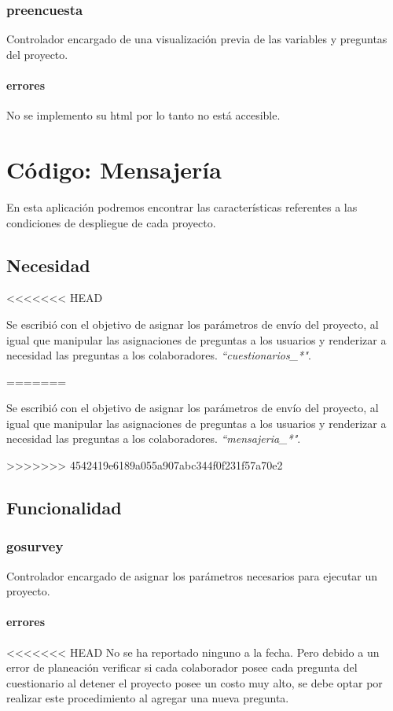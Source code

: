 \documentclass[10pt,a4paper]{book}
\begin{document}
	\subsection{preencuesta}
	Controlador encargado de una visualización previa de las variables y preguntas del proyecto.
	\subsubsection{errores}
	No se implemento su html por lo tanto no está accesible.


	\chapter{Código: Mensajería}

	En esta aplicación podremos encontrar las características referentes a las condiciones de despliegue de cada proyecto.

	\section{Necesidad}
<<<<<<< HEAD

	Se escribió con el objetivo de asignar los parámetros de envío del proyecto, al igual que manipular las asignaciones de preguntas a los usuarios y renderizar a necesidad las preguntas a los colaboradores. \textit{``cuestionarios\_*"}.

=======
	
	Se escribió con el objetivo de asignar los parámetros de envío del proyecto, al igual que manipular las asignaciones de preguntas a los usuarios y renderizar a necesidad las preguntas a los colaboradores. \textit{``mensajeria\_*"}. 
	
>>>>>>> 4542419e6189a055a907abc344f0f231f57a70e2
	\section{Funcionalidad}

	\subsection{gosurvey}
	Controlador encargado de asignar los parámetros necesarios para ejecutar un proyecto.
	\subsubsection{errores}
<<<<<<< HEAD
	No se ha reportado ninguno a la fecha. Pero debido a un error de planeación verificar si cada colaborador posee cada pregunta del cuestionario al detener el proyecto posee un costo muy alto, se debe optar por realizar este procedimiento al agregar una nueva pregunta.
\end{document}
